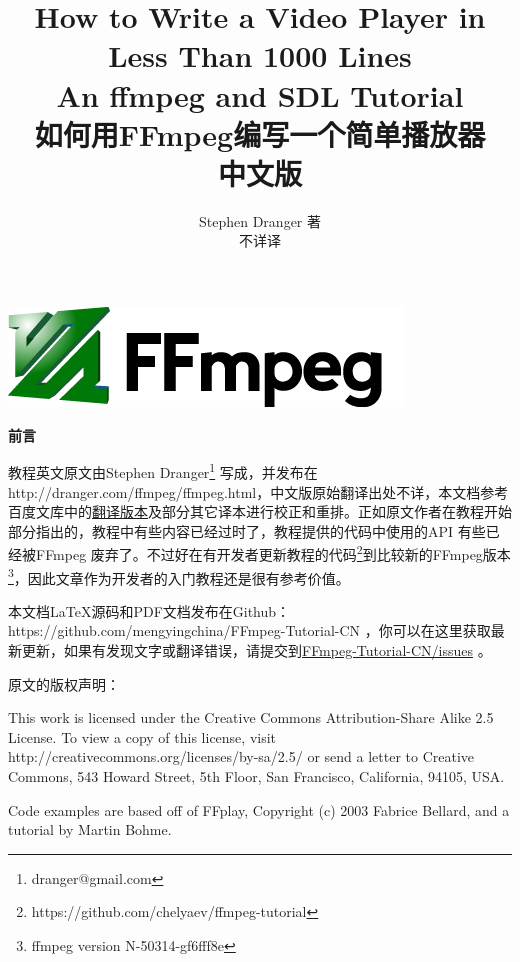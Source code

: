 \documentclass[12pt,a4paper,landscape,fancyhdr,fntef,oneside]{ctexbook}
\title{
\hfill{\small \textbf{How to Write a Video Player in
Less Than 1000 Lines}}\\
\hfill \textbf{An ffmpeg and SDL Tutorial}\\
\hfill \textbf{如何用FFmpeg编写一个简单播放器}\\
\hfill {\large\kaishu 中文版}}
\author{
        \hfill Stephen Dranger \quad 著\\
        \hfill 不详\quad 译\\
}
\makeatletter
\renewenvironment{quote}
                {\kaishu
                 \list{}{\rightmargin   2em
                         \listparindent 2em
                         \itemindent    2em
                         \parsep        0em}
                 \item\relax}
                {\endlist}
\def\printtitle{%
    {\huge {\@title}\par}}      %
\def\printauthor{%
    {\large \@author}}              %
\renewcommand\maketitle{%
  \newpage
  \thispagestyle{empty}


    \includegraphics[height=0.1314\textheight]{FFmpegnewlogo.png}\\ %

%
%
\begin{minipage}{\linewidth}
\begin{flushleft}
\vspace{.2\textheight}
\printtitle
\vspace{.2\textheight}
\printauthor
\end{flushleft}
\end{minipage}
\clearpage}
\makeatother
\begin{document}
\maketitle

\newpage
\thispagestyle{empty}
{\hfil \huge \textbf{前\hspace{2em}言}}\par
\vspace{.1\textheight}

教程英文原文由Stephen Dranger\footnote{dranger@gmail.com} 写成，并发布在http://dranger.com/ffmpeg/ffmpeg.html，中文版原始翻译出处不详，本文档参考百度文库中的\href{http://wenku.baidu.com/view/2a30ffef0975f46527d3e1ac.html }{翻译版本}及部分其它译本进行校正和重排。正如原文作者在教程开始部分指出的，教程中有些内容已经过时了，教程提供的代码中使用的API 有些已经被FFmpeg 废弃了。不过好在有开发者更新教程的代码\footnote{https://github.com/chelyaev/ffmpeg-tutorial}到比较新的FFmpeg版本\footnote{ffmpeg version N-50314-gf6fff8e}，因此文章作为开发者的入门教程还是很有参考价值。

本文档LaTeX源码和PDF文档发布在Github：https://github.com/mengyingchina/FFmpeg-Tutorial-CN ，你可以在这里获取最新更新，如果有发现文字或翻译错误，请提交到\href{https://github.com/mengyingchina/FFmpeg-Tutorial-CN/issues}{FFmpeg-Tutorial-CN/issues} 。

\vspace{1em}
原文的版权声明：
\begin{quote}
\noindent This work is licensed under the Creative Commons Attribution-Share Alike 2.5 License. To view a copy of this license, visit http://creativecommons.org/licenses/by-sa/2.5/ or send a letter to Creative Commons, 543 Howard Street, 5th Floor, San Francisco, California, 94105, USA.

\noindent Code examples are based off of FFplay, Copyright (c) 2003 Fabrice Bellard, and a tutorial by Martin Bohme.
\end{quote}


\frontmatter
\tableofcontents

\mainmatter














\end{document}
